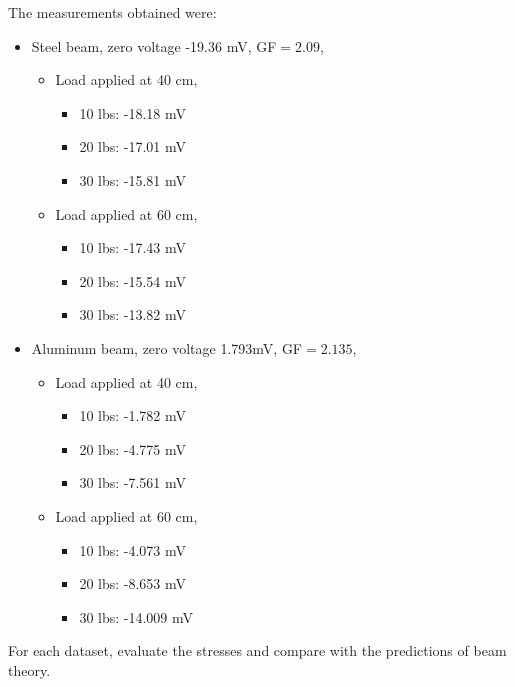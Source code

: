\documentclass[12pt]{article}
\begin{document}
\newpage
The measurements obtained were:
\begin{itemize}[noitemsep]
\item Steel beam, zero voltage -19.36 mV, GF$=2.09$,
  \begin{itemize}[noitemsep]
  \item Load applied at 40 cm,
    \begin{itemize}[noitemsep]
    \item 10 lbs: -18.18 mV
    \item 20 lbs: -17.01 mV
    \item 30 lbs: -15.81 mV
    \end{itemize}
  \item Load applied at 60 cm,
    \begin{itemize}[noitemsep]
    \item 10 lbs: -17.43 mV
    \item 20 lbs: -15.54 mV
    \item 30 lbs: -13.82 mV
    \end{itemize}
  \end{itemize}
\item Aluminum beam, zero voltage 1.793mV, GF$=2.135$,
  \begin{itemize}[noitemsep]
  \item Load applied at 40 cm,
    \begin{itemize}[noitemsep]
    \item 10 lbs: -1.782 mV
    \item 20 lbs: -4.775 mV
    \item 30 lbs: -7.561 mV
    \end{itemize}
  \item Load applied at 60 cm,
    \begin{itemize}[noitemsep]
    \item 10 lbs: -4.073 mV
    \item 20 lbs: -8.653 mV
    \item 30 lbs: -14.009 mV
    \end{itemize}
  \end{itemize}
\end{itemize}

For each dataset, evaluate the stresses and compare with the predictions of beam theory.
\end{document}
